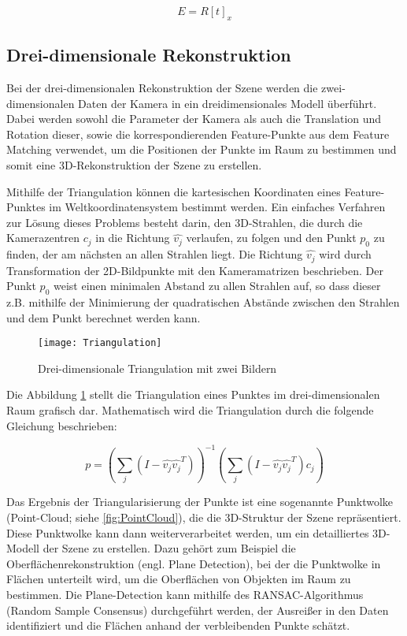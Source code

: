 \[E = R [t]_x\]

\subsection{Drei-dimensionale Rekonstruktion}

Bei der drei-dimensionalen Rekonstruktion der Szene werden die zwei-dimensionalen Daten der Kamera in ein dreidimensionales Modell überführt. Dabei werden sowohl die Parameter der Kamera als auch die Translation und Rotation dieser, sowie die korrespondierenden Feature-Punkte aus dem Feature Matching verwendet, um die Positionen der Punkte im Raum zu bestimmen und somit eine 3D-Rekonstruktion der Szene zu erstellen.

Mithilfe der Triangulation können die kartesischen Koordinaten eines Feature-Punktes im Weltkoordinatensystem bestimmt werden. Ein einfaches Verfahren zur Lösung dieses Problems besteht darin, den 3D-Strahlen, die durch die Kamerazentren \( c_j \) in die Richtung \( \hat{v_j} \) verlaufen, zu folgen und den Punkt \( p_0 \) zu finden, der am nächsten an allen Strahlen liegt. Die Richtung \( \hat{v_j} \) wird durch Transformation der 2D-Bildpunkte mit den Kameramatrizen beschrieben. Der Punkt \( p_0 \) weist einen minimalen Abstand zu allen Strahlen auf, so dass dieser z.B. mithilfe der Minimierung der quadratischen Abstände zwischen den Strahlen und dem Punkt berechnet werden kann.

\begin{figure}
    \centering
    \texttt{[image: Triangulation]}
    \caption{Drei-dimensionale Triangulation mit zwei Bildern\label{fig:Triangulation}}\par
\end{figure}

Die Abbildung \ref{fig:Triangulation} stellt die Triangulation eines Punktes im drei-dimensionalen Raum grafisch dar. Mathematisch wird die Triangulation durch die folgende Gleichung beschrieben:

\[
p = \left( \sum_j \left( I - \hat{v_j} \hat{v_j}^T \right) \right)^{-1} \left( \sum_j \left( I - \hat{v_j} \hat{v_j}^T \right) c_j \right)
\]

Das Ergebnis der Triangularisierung der Punkte ist eine sogenannte Punktwolke (Point-Cloud; siehe \ref{fig:PointCloud}), die die 3D-Struktur der Szene repräsentiert. Diese Punktwolke kann dann weiterverarbeitet werden, um ein detailliertes 3D-Modell der Szene zu erstellen. Dazu gehört zum Beispiel die Oberflächenrekonstruktion (engl. Plane Detection), bei der die Punktwolke in Flächen unterteilt wird, um die Oberflächen von Objekten im Raum zu bestimmen. Die Plane-Detection kann mithilfe des RANSAC-Algorithmus (Random Sample Consensus) durchgeführt werden, der Ausreißer in den Daten identifiziert und die Flächen anhand der verbleibenden Punkte schätzt.

